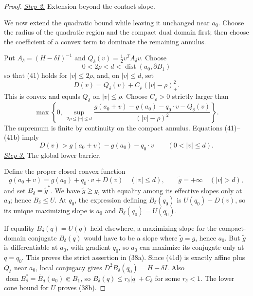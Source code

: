 \documentclass{aomart}
\theoremstyle{definition}
\newcommand{\1}{\mathbf 1}
\begin{document}
\begin{proof}
\smallskip\noindent
\underline{\textit{Step 2.}} Extension beyond the contact slope.

We now extend the quadratic bound while leaving it unchanged near
$a_0$.  Choose the radius of the quadratic region and the compact
dual domain first; then choose the coefficient of a convex term to
dominate the remaining annulus.

Put $A_ \delta=(H-\delta I)^{-1}$ and
$Q_ \delta(v)=\frac12v^TA_ \delta v$.  Choose
\begin{equation*}
0<2\rho<d<\operatorname {dist}(a_ 0,\partial B_ 1)
\end{equation*}
so that (41) holds for $|v|\leq2\rho$, and, on $|v|\leq d$, set
\begin{equation}
D(v)=Q_ \delta(v)+C_ \rho(|v|-\rho)_ +^2.
\tag{41a}
\end{equation}
This is convex and equals $Q_ \delta$ on $|v|\leq\rho$.  Choose
$C_ \rho>0$ strictly larger than
\begin{equation}
\max\!\left\{0,\
\sup_ {2\rho\leq|v|\leq d}
\frac{g(a_ 0+v)-g(a_ 0)-q_ 0\cdot v-Q_ \delta(v)}
{(|v|-\rho)^2}\right\}.
\tag{41b}
\end{equation}
The supremum is finite by continuity on the compact annulus.
Equations (41)--(41b) imply
\begin{equation}
D(v)>g(a_ 0+v)-g(a_ 0)-q_ 0\cdot v
\qquad(0<|v|\leq d).
\tag{41c}
\end{equation}
\smallskip\noindent
\underline{\textit{Step 3.}} The global lower barrier.

Define the proper closed convex function
\begin{equation}
\widetilde g(a_ 0+v)=g(a_ 0)+q_ 0\cdot v+D(v)
\quad(|v|\leq d),\qquad
\widetilde g=+\infty\quad(|v|>d),
\tag{41d}
\end{equation}
and set $B_ \delta=\widetilde g^*$.  We have
$\widetilde g\geq g$, with equality among its effective slopes only
at $a_ 0$; hence $B_ \delta\leq U$.  At $q_ 0$, the expression
defining $B_ \delta(q_ 0)$ is $U(q_ 0)-D(v)$, so its unique maximizing
slope is $a_ 0$ and $B_ \delta(q_ 0)=U(q_ 0)$.

If equality $B_ \delta(q)=U(q)$ held elsewhere, a maximizing slope
for the compact-domain conjugate $B_ \delta(q)$ would have to be a
slope where $\widetilde g=g$, hence $a_ 0$.  But
$\widetilde g$ is differentiable at $a_ 0$, with gradient $q_ 0$,
so $a_ 0$ can maximize its conjugate only at $q=q_ 0$.  This proves
the strict assertion in (38a).  Since (41d) is exactly affine plus
$Q_ \delta$ near $a_ 0$, local conjugacy gives
$D^2B_ \delta(q_ 0)=H-\delta I$.  Also
$\operatorname {dom}B_ \delta^*=\overline B_ d(a_ 0)\Subset B_ 1$,
so $B_ \delta(q)\leq r_ \delta|q|+C_ \delta$ for some
$r_ \delta<1$.  The lower cone bound for $U$ proves (38b).


\end{proof}
\end{document}
